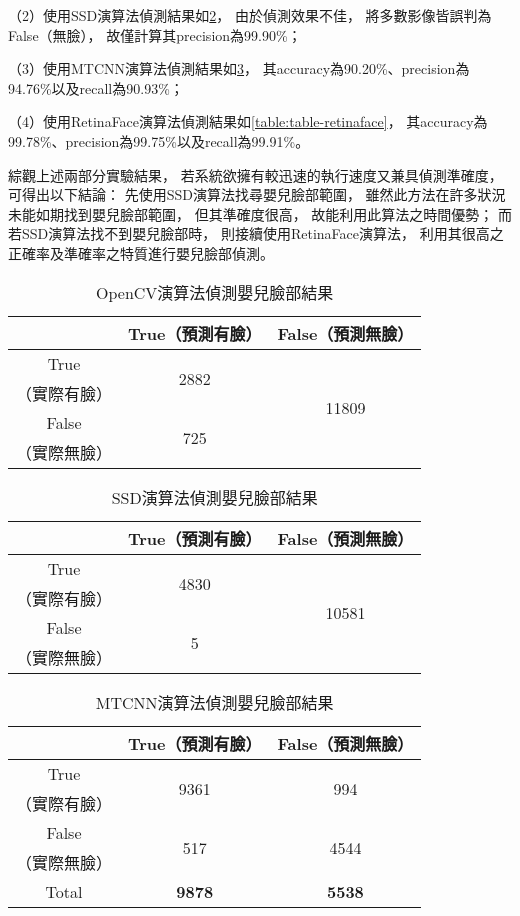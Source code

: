 \documentclass[class=NCU_thesis, crop=false]{standalone}
\begin{document}
（2）使用SSD演算法偵測結果如\cref{table:table-ssd}，
由於偵測效果不佳，
將多數影像皆誤判為False（無臉），
故僅計算其precision為99.90\%；

（3）使用MTCNN演算法偵測結果如\cref{table:table-mtcnn}，
其accuracy為90.20\%、precision為94.76\%以及recall為90.93\%；

（4）使用RetinaFace演算法偵測結果如\cref{table:table-retinaface}，
其accuracy為99.78\%、precision為99.75\%以及recall為99.91\%。

綜觀上述兩部分實驗結果，
若系統欲擁有較迅速的執行速度又兼具偵測準確度，
可得出以下結論：
先使用SSD演算法找尋嬰兒臉部範圍，
雖然此方法在許多狀況未能如期找到嬰兒臉部範圍，
但其準確度很高，
故能利用此算法之時間優勢；
而若SSD演算法找不到嬰兒臉部時，
則接續使用RetinaFace演算法，
利用其很高之正確率及準確率之特質進行嬰兒臉部偵測。

\begin{table}[h]
    \centering
    \caption{OpenCV演算法偵測嬰兒臉部結果}
    \label{table:table-opencv}
    \begin{tabular}{ccc}
    \hline
     & True（預測有臉）& False（預測無臉）\\
    \hline
    True & \multirow{2}{*}{2882} & \multirow{4}{*}{11809} \\
    （實際有臉）& & \\
    False & \multirow{2}{*}{725} & \\
    （實際無臉）&  & \\
    \hline
    \end{tabular}
\end{table}

\begin{table}[h]
    \centering
    \caption{SSD演算法偵測嬰兒臉部結果}
    \label{table:table-ssd}
    \begin{tabular}{ccc}
    \hline
     & True（預測有臉）& False（預測無臉）\\
    \hline
    True & \multirow{2}{*}{4830} & \multirow{4}{*}{10581} \\
    （實際有臉）& & \\
    False & \multirow{2}{*}{5} & \\
    （實際無臉）&  & \\
    \hline
    \end{tabular}
\end{table}

\begin{table}[h]
    \centering
    \caption{MTCNN演算法偵測嬰兒臉部結果}
    \label{table:table-mtcnn}
    \begin{tabular}{ccc}
    \hline
     & True（預測有臉）& False（預測無臉）\\
    \hline
    True & \multirow{2}{*}{9361} & \multirow{2}{*}{994} \\
    （實際有臉）& & \\
    False & \multirow{2}{*}{517} & \multirow{2}{*}{4544} \\
    （實際無臉）&  & \\
    \hline
    Total & \textbf{9878} & \textbf{5538} \\
    \hline
    \end{tabular}
\end{table}
\end{document}
